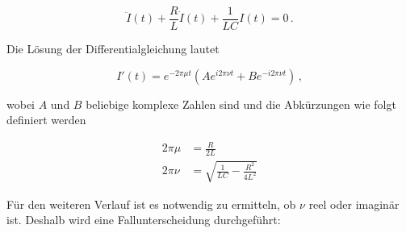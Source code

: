 \begin{equation*}
  \ddot{I}(t) + \frac{R}{L} \dot{I}(t) + \frac{1}{LC} I(t) = 0 \, .
\end{equation*}

Die Lösung der Differentialgleichung lautet

\begin{equation*}
  I'(t) = e^{-2 \pi \mu t} (A e^{i 2 \pi \nu t} + B e^{-i 2 \pi \nu t}) \, ,
\end{equation*}

wobei $A$ und $B$ beliebige komplexe Zahlen sind und die Abkürzungen wie folgt definiert werden

\begin{align}
  2 \pi \mu &= \frac{R}{2L} \\
  2 \pi \nu &= \sqrt{\frac{1}{LC} - \frac{R^2}{4L^2}}
\end{align}

Für den weiteren Verlauf ist es notwendig zu ermitteln, ob $\nu$ reel oder imaginär ist. Deshalb wird eine
Fallunterscheidung durchgeführt:

